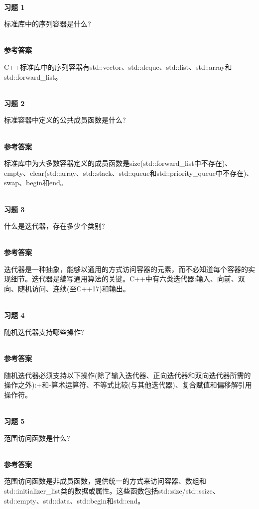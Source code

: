 \hspace*{\fill} \\ %
\noindent
\textbf{习题 1}

标准库中的序列容器是什么?

\hspace*{\fill} \\ %
\noindent
\textbf{参考答案}

C++标准库中的序列容器有std::vector、std::deque、std::list、std::array和std::forward\_list。


\hspace*{\fill} \\ %
\noindent
\textbf{习题 2}

标准容器中定义的公共成员函数是什么?

\hspace*{\fill} \\ %
\noindent
\textbf{参考答案}

标准库中为大多数容器定义的成员函数是size(std::forward\_list中不存在)、empty、clear(std::array、std::stack、std::queue和std::priority\_queue中不存在)、swap、begin和end。

\hspace*{\fill} \\ %
\noindent
\textbf{习题 3}

什么是迭代器，存在多少个类别?

\hspace*{\fill} \\ %
\noindent
\textbf{参考答案}

迭代器是一种抽象，能够以通用的方式访问容器的元素，而不必知道每个容器的实现细节。迭代器是编写通用算法的关键。C++中有六类迭代器:输入、向前、双向、随机访问、连续(至C++17)和输出。

\hspace*{\fill} \\ %
\noindent
\textbf{习题 4}

随机迭代器支持哪些操作?

\hspace*{\fill} \\ %
\noindent
\textbf{参考答案}

随机迭代器必须支持以下操作(除了输入迭代器、正向迭代器和双向迭代器所需的操作之外):+和-算术运算符、不等式比较(与其他迭代器)、复合赋值和偏移解引用操作符。

\hspace*{\fill} \\ %
\noindent
\textbf{习题 5}

范围访问函数是什么?

\hspace*{\fill} \\ %
\noindent
\textbf{参考答案}

范围访问函数是非成员函数，提供统一的方式来访问容器、数组和std::initializer\_list类的数据或属性。这些函数包括std::size/std::ssize、std::empty、std::data、std::begin和std::end。












